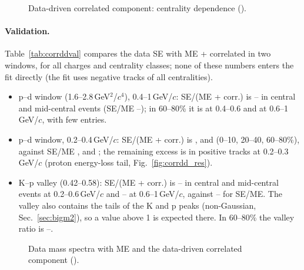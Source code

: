 \begin{figure}[H]
\centering
{}
\caption{Data-driven correlated component: centrality dependence ().}
\end{figure}

\paragraph{Validation.} Table~\ref{tab:corrddval} compares the data SE with ME + correlated in two windows, for all charges and
centrality classes; none of these numbers enters the fit directly (the fit uses negative tracks of all centralities).
\begin{itemize}
\item p--d window (1.6--2.8\,GeV$^2$/$c^4$), 0.4--1\,GeV/$c$: SE/(ME + corr.) is \cddPdCMMin--\cddPdCMMax{} in central and mid-central
  events (SE/ME \cddPdSEMEMin--\cddPdSEMEMax);
  in 60--80\% it is \cddRpdPerB{} at 0.4--0.6 and \cddRpdPerC{} at 0.6--1\,GeV/$c$, with few entries.
\item p--d window, 0.2--0.4\,GeV/$c$: SE/(ME + corr.) is \cddRpdCiA, \cddRpdMidA{} and \cddRpdPerA{} (0--10, 20--40, 60--80\%), against
  SE/ME \tmplFastRatMECiA, \tmplFastRatMEMidA{} and \tmplFastRatMEPerA; the remaining excess is in positive tracks at 0.2--0.3\,GeV/$c$ (proton energy-loss tail, Fig.~\ref{fig:corrdd_res}).
\item K--p valley (0.42--0.58): SE/(ME + corr.) is \cddVaCMabMin--\cddVaCMabMax{} in central and mid-central events at
  0.2--0.6\,GeV/$c$ and \cddVaCMcMin--\cddVaCMcMax{} at 0.6--1\,GeV/$c$, against \cddVaSEMEMin--\cddVaSEMEMax{} for SE/ME. The valley also contains the tails of the K and p peaks (non-Gaussian, Sec.~\ref{sec:bigm2}),
  so a value above 1 is expected there. In 60--80\% the valley ratio is \cddVaPerMin--\cddVaPerMax.
\end{itemize}



\begin{figure}[H]
\centering
{}
\caption{Data mass spectra with ME and the data-driven correlated component ().}
\end{figure}

